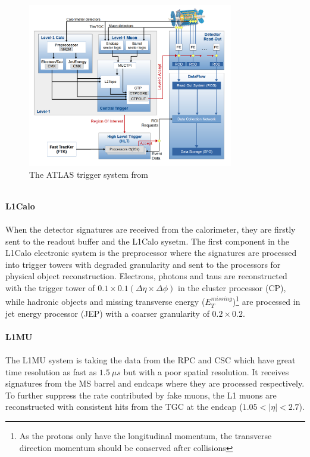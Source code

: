 \begin{figure}[!h]                
	\includegraphics[width=0.8\textwidth]{Chapter2/Trigger.png}
	\centering
	\begin{center}
		\caption{The ATLAS trigger system from \cite{trigger_str}}
		\label{Fig:trigger}            
	\end{center}
\end{figure}
\noindent
\\{\bf L1Calo}
\\
\\When the detector signatures are received from the calorimeter, they are firstly sent to the readout buffer and the L1Calo sysetm. The first component in the L1Calo electronic system is the preprocessor where the signatures are processed into trigger towers with degraded granularity and sent to the processors for physical object reconstruction. Electrons, photons and taus are reconstructed with the trigger tower of $0.1 \times 0.1 (\Delta \eta \times \Delta \phi)$ in the cluster processor (CP), while hadronic objects and missing transverse energy ($E_{T}^{missing}$)\footnote{As the protons only have the longitudinal momentum, the transverse direction momentum should be conserved after collisions} are processed in jet energy processor (JEP) with a coarser granularity of $0.2\times 0.2$.
\\
\\{\bf L1MU}
\\
\\The L1MU system is taking the data from the RPC and CSC which have great time resolution as fast as $1.5~\mu s$ but with a poor spatial resolution. It receives signatures from the MS barrel and endcaps where they are processed respectively. To further suppress the rate contributed by fake muons, the L1 muons are reconstructed with consistent hits from the TGC at the endcap ($1.05<|\eta|<2.7$). 
